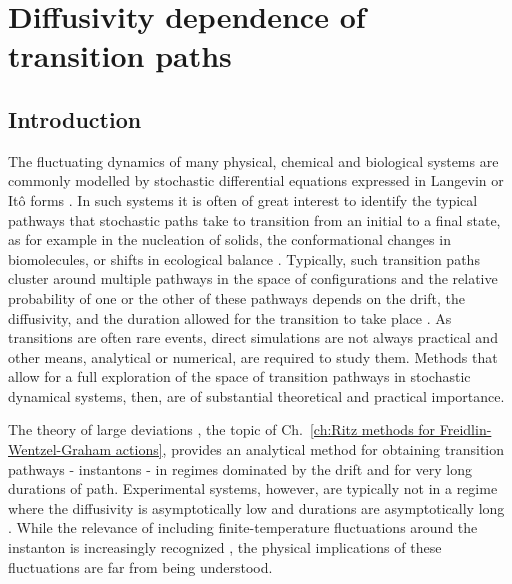\chapter{Diffusivity dependence of transition paths} \label{ch:Diffusivity dependence of transition paths}

\section{Introduction}


The fluctuating dynamics of many physical, chemical and biological
systems are commonly modelled by stochastic differential equations
expressed in Langevin or Itô forms \citep{kampenStochasticProcessesPhysics2011,gardinerStochasticMethodsHandbook2010,riskenFokkerPlanckEquationMethods2012,bharucha-reidElementsTheoryMarkov2012}.
In such systems it is often of great interest to identify the typical
pathways that stochastic paths take to transition from an initial
to a final state, as for example in the nucleation of solids, the
conformational changes in biomolecules, or shifts in ecological balance
\citep{faccioliDominantPathwaysProtein2006, demarcoPhaseTransitionModel2001, gardnerConstructionGeneticToggle2000, mangelBarrierTransitionsDriven1994, wolynesNavigatingFoldingRoutes1995, huangMolecularMathematicalBasis2012, paninskiMostLikelyVoltage2006, noltingBallsCupsQuasipotentials2016, leeFindingMultipleReaction2017}.
Typically, such transition paths cluster around multiple pathways
in the space of configurations and the relative probability of one
or the other of these pathways depends on the drift, the diffusivity,
and the duration allowed for the transition to take place \citep{onsagerFluctuationsIrreversibleProcesses1953,bachFunctionalsPathsDiffusion1977,itoProbabilisticConstructionLagrangean1978,ikedaStochasticDifferentialEquations2014}.
As transitions are often rare events, direct simulations are not always
practical and other means, analytical or numerical, are required to
study them. Methods that allow for a full exploration of the space
of transition pathways in stochastic dynamical systems, then, are
of substantial theoretical and practical importance.

The theory of large deviations \citep{ventselSMALLRANDOMPERTURBATIONS1970,stratonovichMarkovMethodsTheory1989,grahamMacroscopicPotentialsBifurcations1989,arnoldStochasticDifferentialEquations1974}, the topic of Ch.~\ref{ch:Ritz methods for Freidlin-Wentzel-Graham actions},
provides an analytical method for obtaining transition pathways -
instantons - in regimes dominated by the drift and for very long durations
of path. Experimental systems, however, are typically not in a regime
where the diffusivity is asymptotically low and durations are asymptotically
long \citep{gladrowExperimentalMeasurementRelative2021}. While the
relevance of including finite-temperature fluctuations around the
instanton \citep{gelfandIntegrationFunctionalSpaces1960} is increasingly
recognized \citep{nickelsenNoiseCorrectionLarge2022, corazzaNormalizedGaussianPath2020b, luGaussianApproximationsTransition2017a},
the physical implications of these fluctuations are far from being
understood.

